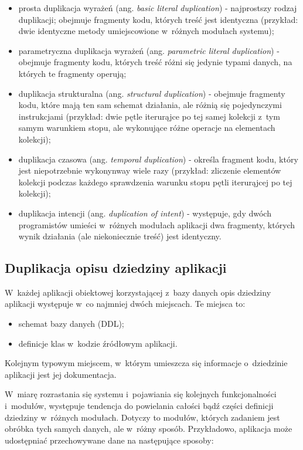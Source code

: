 \begin{itemize}
 \item prosta duplikacja wyrażeń (ang. \emph{basic literal duplication}) - najprostszy rodzaj duplikacji; obejmuje fragmenty kodu, których treść jest identyczna (przykład: dwie identyczne metody umiejscowione w~różnych modułach systemu);
 \item parametryczna duplikacja wyrażeń (ang. \emph{parametric literal duplication}) - obejmuje fragmenty kodu, których treść różni się jedynie typami danych, na których te fragmenty operują;
 \item duplikacja strukturalna (ang. \emph{structural duplication}) - obejmuje fragmenty kodu, które mają ten sam schemat działania, ale różnią się pojedynczymi instrukcjami (przykład: dwie pętle iterurąjce po tej samej kolekcji z~tym samym warunkiem stopu, ale wykonujące różne operacje na elementach kolekcji);
 \item duplikacja czasowa (ang. \emph{temporal duplication}) - określa fragment kodu, który jest niepotrzebnie wykonynway wiele razy (przykład: zliczenie elementów kolekcji podczas każdego sprawdzenia warunku stopu pętli iterurąjcej po tej kolekcji);
 \item duplikacja intencji (ang. \emph{duplication of intent}) - występuje, gdy dwóch programistów umieści w~różnych modułach aplikacji dwa fragmenty, których wynik działania (ale niekoniecznie treść) jest identyczny.
\end{itemize}


\subsection{Duplikacja opisu dziedziny aplikacji}

W~każdej aplikacji obiektowej korzystającej z~bazy danych opis dziedziny aplikacji występuje w~co najmniej dwóch miejscach.
Te miejsca to:

\begin{itemize}
 \item schemat bazy danych (DDL);
 \item definicje klas w~kodzie źródłowym aplikacji.
\end{itemize}

Kolejnym typowym miejscem, w~którym umieszcza się informacje o~dziedzinie aplikacji jest jej dokumentacja.

W~miarę rozrastania się systemu i~pojawiania się kolejnych funkcjonalności i~modułów, występuje tendencja do powielania całości bądź części definicji dziedziny w~różnych modułach.
Dotyczy to modułów, których zadaniem jest obróbka tych samych danych, ale w~różny sposób.
Przykładowo, aplikacja może udostępniać przechowywane dane na następujące sposoby:

